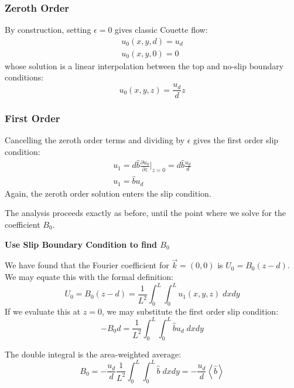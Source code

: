 \documentclass[12pt, a4paper, twoside, openright]{book}
\begin{document}
\subsubsection*{Zeroth Order}

By construction, setting $\epsilon = 0$ gives classic Couette flow:
\begin{gather}
u_0(x,y,d) = u_d \\
u_0(x,y,0) = 0
\end{gather}
whose solution is a linear interpolation between the top and no-slip boundary conditions:
\begin{equation}
u_0(x,y,z) = \frac{u_d}{d} z
\end{equation}

\subsubsection*{First Order}
Cancelling the zeroth order terms and dividing by $\epsilon$ gives the first order slip condition:
\begin{gather}
u_1 = d \hat{b} \frac{\partial u_0}{\partial z} \rvert_{z=0}
= d \hat{b} \frac{u_d}{d} \\
u_1 = \hat{b} u_d
\end{gather}
Again, the zeroth order solution enters the slip condition.

\vspace{1em}
The analysis proceeds exactly as before, until the point where we solve for the coefficient $B_0$.
\vspace{1em}

\textbf{Use Slip Boundary Condition to find $B_0$}

We have found that the Fourier coefficient for $\vec{k} = (0,0)$ is $U_0 = B_0 (z - d)$.
We may equate this with the formal definition:
\begin{equation}
U_0 = B_0 (z - d) = \frac{1}{L^2} \int_0^L \int_0^L u_1(x,y,z) \;dxdy
\end{equation}
If we evaluate this at $z=0$, we may substitute the first order slip condition:
\begin{equation}
- B_0 d = \frac{1}{L^2} \int_0^L \int_0^L \hat{b} u_d \;dxdy
\end{equation}

The double integral is the area-weighted average:
\begin{equation}
B_0 = - \frac{u_d}{d} \frac{1}{L^2} \int_0^L \int_0^L \hat{b} \;dxdy
= - \frac{u_d}{d} \left< \hat{b} \right>
\end{equation}
\end{document}
